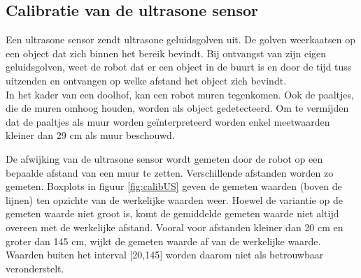 \documentclass[tt3]{penoverslag}
\begin{document}
\subsection{Calibratie van de ultrasone sensor} %
\label{ssec:calibUS}
Een ultrasone sensor zendt ultrasone geluidsgolven uit. De golven weerkaatsen op een object dat zich binnen het bereik bevindt. Bij ontvangst van zijn eigen geluidsgolven, weet de robot dat er een object in de buurt is en door de tijd tuss uitzenden en ontvangen op welke afstand het object zich bevindt.\\

In het kader van een doolhof, kan een robot muren tegenkomen. Ook de paaltjes, die de muren omhoog houden, worden als object gedetecteerd. Om te vermijden dat de paaltjes als muur worden ge\"interpreteerd worden enkel meetwaarden kleiner dan 29 cm als muur beschouwd.

De afwijking van de ultrasone sensor wordt gemeten door de robot op een bepaalde afstand van een muur te zetten. Verschillende afstanden worden zo gemeten. Boxplots in figuur \ref{fig:calibUS} geven de gemeten waarden (boven de lijnen) ten opzichte van de werkelijke waarden weer. Hoewel de variantie op de gemeten waarde niet groot is, komt de gemiddelde gemeten waarde niet altijd overeen met de werkelijke afstand. Vooral voor afstanden kleiner dan 20 cm en groter dan 145 cm, wijkt de gemeten waarde af van de werkelijke waarde. Waarden buiten het interval [20,145] worden daarom niet als betrouwbaar veronderstelt.
\end{document}
